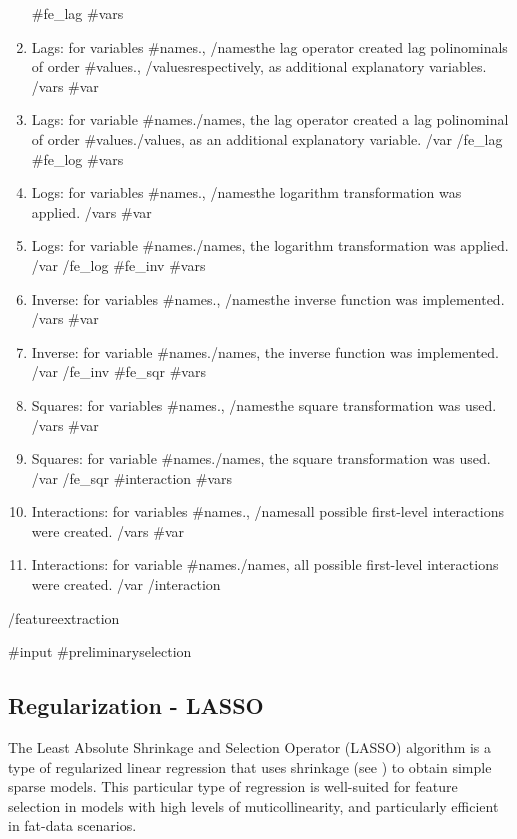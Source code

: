 \documentclass{article}
\begin{document}
\begin{enumerate}
  {{#fe_lag}}
    {{#vars}}
    \item Lags: for variables {{#names}}{{{.}}}, {{/names}}the lag operator created lag polinominals of order {{#values}}{{{.}}}, {{/values}}respectively, as additional explanatory variables.
    {{/vars}}
    {{#var}}
    \item Lags: for variable {{#names}}{{.}}{{/names}}, the lag operator created a lag polinominal of order {{#values}}{{.}}{{/values}}, as an additional explanatory variable.
    {{/var}}
  {{/fe_lag}}
  {{#fe_log}}
    {{#vars}}
    \item Logs: for variables {{#names}}{{.}}, {{/names}}the logarithm transformation was applied.
    {{/vars}}
    {{#var}}
    \item Logs: for variable {{#names}}{{.}}{{/names}}, the logarithm transformation was applied.
    {{/var}}
  {{/fe_log}}
  {{#fe_inv}}
    {{#vars}}
    \item Inverse: for variables {{#names}}{{.}}, {{/names}}the inverse function was implemented.
    {{/vars}}
    {{#var}}
    \item Inverse: for variable {{#names}}{{.}}{{/names}}, the inverse function was implemented.
    {{/var}}
  {{/fe_inv}}
  {{#fe_sqr}}
    {{#vars}}
    \item Squares: for variables {{#names}}{{.}}, {{/names}}the square transformation was used.
    {{/vars}}
    {{#var}}
    \item Squares: for variable {{#names}}{{.}}{{/names}}, the square transformation was used.
    {{/var}}
  {{/fe_sqr}} 
  {{#interaction}}
    {{#vars}}
    \item Interactions: for variables {{#names}}{{.}}, {{/names}}all possible first-level interactions were created.
    {{/vars}}
    {{#var}}
    \item Interactions: for variable {{#names}}{{.}}{{/names}}, all possible first-level interactions were created.
    {{/var}}
  {{/interaction}}
\end{enumerate}
{{/featureextraction}}

{{#input}}
{{#preliminaryselection}}
\subsection{Regularization - LASSO}
The Least Absolute Shrinkage and Selection Operator (LASSO) algorithm is a type of regularized linear regression that uses shrinkage (see \cite{tibshirani1996}) to obtain simple sparse models. This particular type of regression is well-suited for feature selection in models with high levels of muticollinearity, and particularly efficient in fat-data scenarios.
\end{document}
